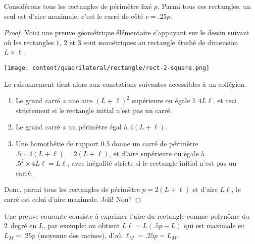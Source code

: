 \begin{fact} \label{iso-rect}
	Considérons tous les rectangles de périmètre fixé $p$. Parmi tous ces rectangles, un seul est d'aire maximale, c'est le carré de côté $c = \num{.25} p$.
\end{fact}


\begin{proof}
	Voici une preuve géométrique élémentaire s'appuyant sur le dessin suivant où les rectangles $1$, $2$ et $3$ sont isométriques au rectangle étudié de dimension $L \times \ell$.

	\begin{center}
		\texttt{[image: content/quadrilateral/rectangle/rect-2-square.png]}
	\end{center}
	
	Le raisonnement tient alors aux constations suivantes accessibles à un collégien.
	\begin{enumerate}
		\item Le grand carré a une aire $(L + \ell)^2$ supérieure ou égale à $4 L \ell$, et ceci strictement si le rectangle initial n'est pas un carré.

		\item Le grand carré a un périmètre égal à $4 (L + \ell)$.

		\item Une homothétie de rapport \num{.5} donne un carré 
		de périmètre $\num{.5} \times 4 (L + \ell) = 2 (L + \ell)$,
		et d'aire supérieure ou égale à $\num{.5}^2 \times 4 L \ell =  L \ell$, avec inégalité stricte si le rectangle initial n'est pas un carré.
	\end{enumerate}
	
	Donc, parmi tous les rectangles de périmètre $p = 2 (L + \ell)$ et d'aire $L \ell$, le carré est celui d'aire maximale. Joli! Non?
\end{proof}




\begin{remark}
	Une preuve courante consiste à exprimer l'aire du rectangle comme polynôme du 2\ieme\ degré en $L$, par exemple: on obtient $L \ell = L (\num{.5} p - L)$ qui est maximale en $L_M = \num{.25} p$ (moyenne des racines), d'où $\ell_M = \num{.25} p = L_M$.
\end{remark}




